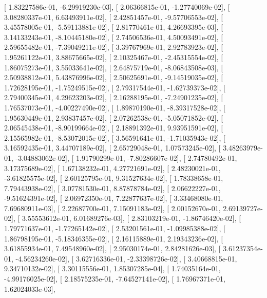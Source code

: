 \documentclass{article}
\begin{document}
       [  1.83227586e-01,  -6.29919230e-03],
       [  2.06366815e-01,  -1.27740069e-02],
       [  3.08280337e-01,   6.63493911e-02],
       [  2.42851457e-01,  -9.57706553e-02],
       [  3.45578005e-01,  -5.59113881e-02],
       [  2.81770461e-01,   4.26693395e-03],
       [  3.14133243e-01,  -8.10445180e-02],
       [  2.74506536e-01,   4.50093491e-02],
       [  2.59655482e-01,  -7.39049211e-02],
       [  3.39767969e-01,   2.92783923e-02],
       [  1.95261122e-01,   3.88675665e-02],
       [  2.10325467e-01,  -2.45315554e-02],
       [  1.86075273e-01,   3.55033641e-02],
       [  2.64875719e-01,  -8.06843508e-03],
       [  2.50938812e-01,   5.43876996e-02],
       [  2.50625691e-01,  -9.14519035e-02],
       [  1.72628195e-01,  -1.75249515e-02],
       [  2.79317544e-01,  -1.62739373e-02],
       [  2.79400345e-01,   4.29623203e-02],
       [  2.16288195e-01,  -7.24901235e-02],
       [  1.76537073e-01,  -4.00227490e-02],
       [  1.89870190e-01,  -8.39317528e-02],
       [  1.95630449e-01,   2.93837457e-02],
       [  2.07262538e-01,  -5.05071852e-02],
       [  2.06545438e-01,  -8.90199664e-02],
       [  2.18891392e-01,   9.93951591e-02],
       [  2.15565982e-01,  -8.53072015e-02],
       [  3.56591641e-01,  -1.71035943e-02],
       [  3.16592435e-01,   3.44707189e-02],
       [  2.65729048e-01,   1.07573245e-02],
       [  3.48263979e-01,  -3.04883062e-02],
       [  1.91790299e-01,  -7.80286607e-02],
       [  2.74780492e-01,   3.17375689e-02],
       [  1.67138232e-01,   4.27721691e-02],
       [  2.48230021e-01,  -3.61825575e-02],
       [  2.60125795e-01,   9.31527634e-02],
       [  1.78338658e-01,   7.79443938e-02],
       [  3.07781530e-01,   8.87878784e-02],
       [  2.06622227e-01,  -9.51624391e-02],
       [  2.06972350e-01,   7.22877637e-02],
       [  3.33468080e-01,   7.69680911e-03],
       [  2.22687700e-01,   7.15091183e-02],
       [  2.00152670e-01,   2.69139727e-02],
       [  3.55553612e-01,   6.01689276e-03],
       [  2.83103219e-01,  -1.86746420e-02],
       [  1.79771637e-01,  -1.77265142e-02],
       [  2.53201561e-01,  -1.09985388e-02],
       [  1.86798195e-01,  -5.18346355e-02],
       [  2.16115889e-01,   2.19343236e-02],
       [  3.61855934e-01,   7.49548960e-02],
       [  2.95030174e-01,   2.84281626e-03],
       [  3.61237354e-01,  -4.56234260e-02],
       [  3.62716336e-01,  -2.33398726e-02],
       [  3.40668815e-01,   9.34710132e-02],
       [  3.30115556e-01,   1.85307285e-04],
       [  1.74035164e-01,  -4.99176025e-02],
       [  2.18575235e-01,  -7.64527141e-02],
       [  1.76967371e-01,   1.62024033e-03],
\end{document}
